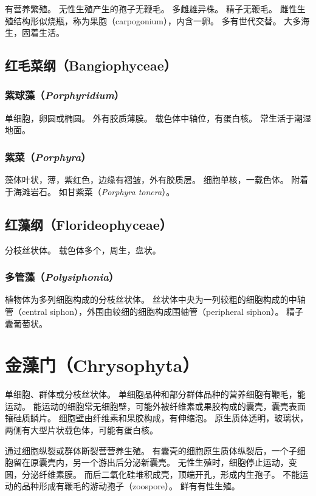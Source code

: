 \documentclass[11pt]{article}
\begin{document}
\newline

有营养繁殖。
无性生殖产生的孢子无鞭毛。
多雌雄异株。
精子无鞭毛。
雌性生殖结构形似烧瓶，称为果胞（carpogonium），内含一卵。
多有世代交替。
大多海生，固着生活。

\subsection{红毛菜纲（Bangiophyceae）}
\subsubsection{紫球藻（\textit{Porphyridium}）}
单细胞，卵圆或椭圆。
外有胶质薄膜。
载色体中轴位，有蛋白核。
常生活于潮湿地面。

\subsubsection{紫菜（\textit{Porphyra}）}
藻体叶状，薄，紫红色，边缘有褶皱，外有胶质层。
细胞单核，一载色体。
附着于海滩岩石。
如甘紫菜（\textit{Porphyra tonera}）。

\subsection{红藻纲（Florideophyceae）}
分枝丝状体。
载色体多个，周生，盘状。

\subsubsection{多管藻（\textit{Polysiphonia}）}
植物体为多列细胞构成的分枝丝状体。
丝状体中央为一列较粗的细胞构成的中轴管（central siphon），外围由较细的细胞构成围轴管（peripheral siphon）。
精子囊葡萄状。

\section{金藻门（Chrysophyta）}
单细胞、群体或分枝丝状体。
单细胞品种和部分群体品种的营养细胞有鞭毛，能运动。
能运动的细胞常无细胞壁，可能外被纤维素或果胶构成的囊壳，囊壳表面镶硅质鳞片。
细胞壁由纤维素和果胶构成，有伸缩泡。
原生质体透明，玻璃状，两侧有大型片状载色体，可能有蛋白核。

\newline

通过细胞纵裂或群体断裂营营养生殖。
有囊壳的细胞原生质体纵裂后，一个子细胞留在原囊壳内，另一个游出后分泌新囊壳。
无性生殖时，细胞停止运动，变圆，分泌纤维素膜。
而后二氧化硅堆积成壳，顶端开孔，形成内生孢子。
不能运动的品种形成有鞭毛的游动孢子（zoospore）。
鲜有有性生殖。
\end{document}
